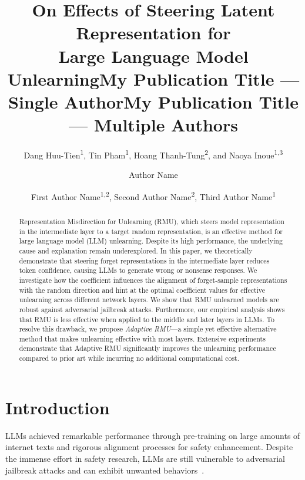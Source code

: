 \documentclass[letterpaper]{article} %
\title{On Effects of Steering Latent Representation for \\Large Language Model Unlearning}
\author{Dang Huu-Tien\textsuperscript{\rm 1}, Tin Pham\textsuperscript{\rm 1}, Hoang Thanh-Tung\textsuperscript{\rm 2}, and Naoya Inoue\textsuperscript{\rm 1,\rm 3}}
\title{My Publication Title --- Single Author}
\author {
    Author Name
}
\title{My Publication Title --- Multiple Authors}
\author {
    First Author Name\textsuperscript{\rm 1,\rm 2},
    Second Author Name\textsuperscript{\rm 2},
    Third Author Name\textsuperscript{\rm 1}
}
\begin{document}
\maketitle

\begin{abstract}
Representation Misdirection for Unlearning (RMU), which steers model representation in the intermediate layer to a target random representation, is an effective method for large language model (LLM) unlearning. Despite its high performance, the underlying cause and explanation remain underexplored.
In this paper, we theoretically demonstrate that steering forget representations in the intermediate layer reduces token confidence, causing LLMs to generate wrong or nonsense responses. We investigate how the coefficient influences the alignment of forget-sample representations with the random direction and hint at the optimal coefficient values for effective unlearning across different network layers. We show that RMU unlearned models are robust against adversarial jailbreak attacks.
Furthermore, our empirical analysis shows that RMU is less effective when applied to the middle and later layers in LLMs.
To resolve this drawback, we propose \textit{Adaptive RMU}---a simple yet effective alternative method that makes unlearning effective with most layers.
Extensive experiments demonstrate that Adaptive RMU significantly improves the unlearning performance compared to prior art while incurring no additional computational cost.
\end{abstract}

%

\section{Introduction}
LLMs achieved remarkable performance through pre-training on large amounts of internet texts and rigorous alignment processes for safety enhancement. 
Despite the immense effort in safety research, LLMs are still vulnerable to adversarial jailbreak attacks and can exhibit unwanted behaviors~\cite{shahscalable, zou2023universal, jones2023automatically, yuan2024gpt, wei2024jailbroken}.
\end{document}
